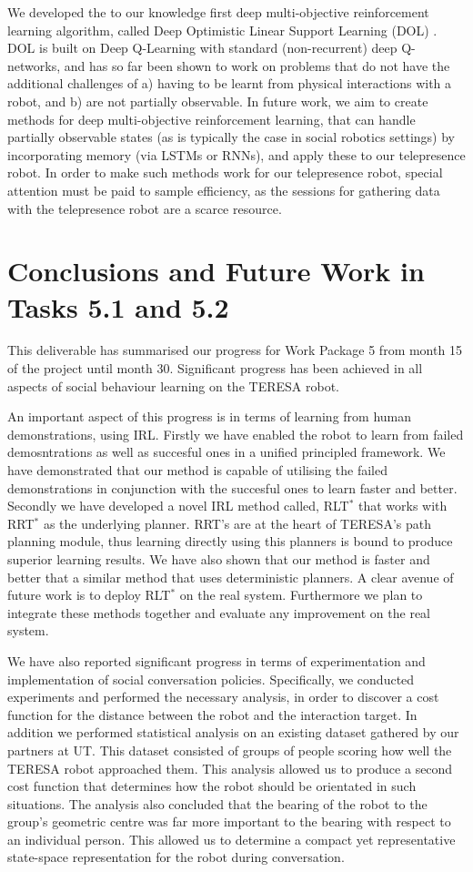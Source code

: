\documentclass[a4paper,11pt]{report}
\begin{document}
We developed the to our knowledge first deep multi-objective reinforcement learning algorithm, called Deep Optimistic Linear Support Learning (DOL) \cite{hossam2016}. DOL is built on Deep Q-Learning with standard (non-recurrent) deep Q-networks, and has so far been shown to work on problems that do not have the additional challenges of a) having to be learnt from physical interactions with a robot, and b) are not partially observable. In future work, we aim to create methods for deep multi-objective reinforcement learning, that can handle partially observable states (as is typically the case in social robotics settings) by incorporating memory (via LSTMs or RNNs), and apply these to our telepresence robot. In order to make such methods work for our telepresence robot, special attention must be paid to sample efficiency, as the sessions for gathering data with the telepresence robot are a scarce resource. 

\section{Conclusions and Future Work in Tasks 5.1 and 5.2}
\label{sec:conclusions}
This deliverable has summarised our progress for Work Package 5 from month 15 of the project until month 30. Significant progress has been achieved in all aspects of social behaviour learning on the TERESA robot. 

 An important aspect of this progress is in terms of learning from human demonstrations, using IRL. Firstly we have enabled the robot to learn from failed demosntrations as well as succesful ones in a unified principled framework. We have demonstrated that our method is capable of utilising the failed demonstrations in conjunction with the succesful ones to learn faster and better. Secondly we have developed a novel IRL method called, RLT$^*$ that works with RRT$^*$ as the underlying planner. RRT's are at the heart of TERESA's path planning module, thus learning directly using this planners is bound to produce superior learning results. We have also shown that our method is faster and better that a similar method that uses deterministic planners. A clear avenue of future work is to deploy RLT$^*$ on the real system. Furthermore we plan to integrate these methods together and evaluate any improvement on the real system.

 We have also reported significant progress in terms of experimentation and implementation of social conversation policies. Specifically, we conducted experiments and performed the necessary analysis, in order to discover a cost function for the distance between the robot and the interaction target. In addition we performed statistical analysis on an existing dataset gathered by our partners at UT. This dataset consisted of groups of people scoring how well the TERESA robot approached them. This analysis allowed us to produce a second cost function that determines how the robot should be orientated in such situations. The analysis also concluded that the bearing of the robot to the group's geometric centre was far more important to the bearing with respect to an individual person. This allowed us to determine a compact yet representative state-space representation for the robot during conversation. 
\end{document}
